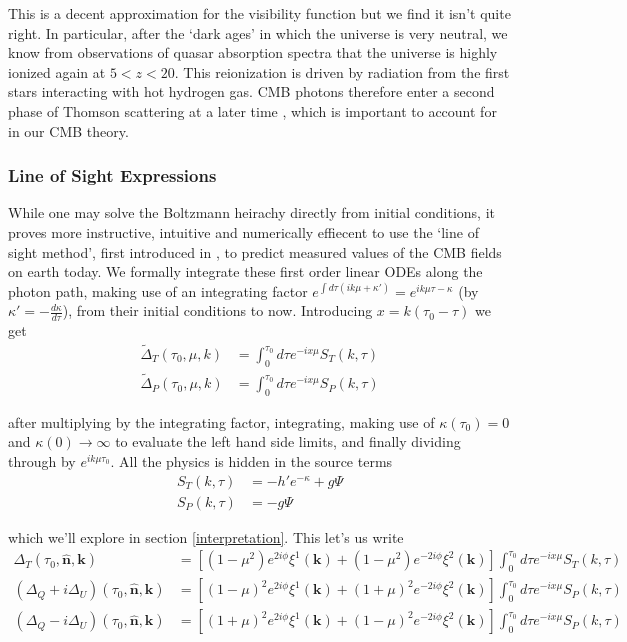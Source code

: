 \documentclass[a4paper,10pt]{article}
\renewcommand{\v}[1]{\mathbf{#1}}
\newcommand{\unit}[1]{\hat{\v{#1}}}
\begin{document}
This is a decent approximation for the visibility function but we find it isn't quite right. In particular, after the `dark ages' in which the universe is very neutral, we know from observations of quasar absorption spectra that the universe is highly ionized again at $5<z<20$. This reionization is driven by radiation from the first stars interacting with hot hydrogen gas. CMB photons therefore enter a second phase of Thomson scattering at a later time \cite{reionisation}, which is important to account for in our CMB theory.

\subsubsection{Line of Sight Expressions}

While one may solve the Boltzmann heirachy directly from initial conditions, it proves more instructive, intuitive and numerically effiecent to use the `line of sight method', first introduced in \cite{LoS}, to predict measured values of the CMB fields on earth today. We formally integrate these first order linear ODEs along the photon path, making use of an integrating factor $e^{\int d\tau (ik\mu+\kappa')} = e^{ik\mu\tau-\kappa}$ (by $\kappa'=-\frac{d\kappa}{d\tau}$), from their initial conditions to now.  Introducing $x=k(\tau_0-\tau)$ we get  
\begin{equation}\begin{split}
\tilde{\Delta}_T(\tau_0,\mu,k) &= \int_0^{\tau_0}d\tau e^{-ix\mu}S_T(k,\tau)\\
\tilde{\Delta}_P(\tau_0,\mu,k) &= \int_0^{\tau_0}d\tau e^{-ix\mu}S_P(k,\tau)
\end{split}\end{equation}

after multiplying by the integrating factor, integrating, making use of $\kappa(\tau_0)=0$ and $\kappa(0)\rightarrow \infty$ to evaluate the left hand side limits, and finally dividing through by $e^{ik\mu\tau_0}$. All the physics is hidden in the source terms
\begin{equation}\begin{split}
S_T(k,\tau) &= -h'e^{-\kappa}+g\Psi\\
S_P(k,\tau) &= -g\Psi
\end{split}\end{equation}

which we'll explore in section \ref{interpretation}. This let's us write
\begin{equation}\begin{split}
\Delta_T(\tau_0,\unit{n},\v{k}) &= [(1-\mu^2) e^{2i\phi} \xi^1(\v{k})+(1-\mu^2) e^{-2i\phi} \xi^2(\v{k})]\int_0^{\tau_0}d\tau e^{-ix\mu}S_T(k,\tau)\\
(\Delta_Q+i\Delta_U)(\tau_0,\unit{n},\v{k}) &=[(1-\mu)^2 e^{2i\phi} \xi^1(\v{k})+(1+\mu)^2 e^{-2i\phi} \xi^2(\v{k})]\int_0^{\tau_0}d\tau e^{-ix\mu}S_P(k,\tau)\\
(\Delta_Q-i\Delta_U)(\tau_0,\unit{n},\v{k}) &=[(1+\mu)^2 e^{2i\phi} \xi^1(\v{k})+(1-\mu)^2 e^{-2i\phi} \xi^2(\v{k})]\int_0^{\tau_0}d\tau e^{-ix\mu}S_P(k,\tau)
\end{split}\end{equation}
\end{document}

